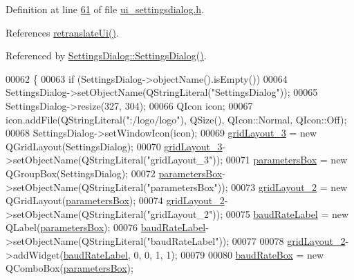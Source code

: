 Definition at line \hyperlink{a00141_source_l00061}{61} of file \hyperlink{a00141_source}{ui\+\_\+settingsdialog.\+h}.



References \hyperlink{a00141_source_l00198}{retranslate\+Ui()}.



Referenced by \hyperlink{a00131_source_l00052}{Settings\+Dialog\+::\+Settings\+Dialog()}.


\begin{DoxyCode}
00062     \{
00063         \textcolor{keywordflow}{if} (SettingsDialog->objectName().isEmpty())
00064             SettingsDialog->setObjectName(QStringLiteral(\textcolor{stringliteral}{"SettingsDialog"}));
00065         SettingsDialog->resize(327, 304);
00066         QIcon icon;
00067         icon.addFile(QStringLiteral(\textcolor{stringliteral}{":/logo/logo"}), QSize(), QIcon::Normal, QIcon::Off);
00068         SettingsDialog->setWindowIcon(icon);
00069         \hyperlink{a00082_a2cc53955b73f22f0cfcf508da4654b16}{gridLayout\_3} = \textcolor{keyword}{new} QGridLayout(SettingsDialog);
00070         \hyperlink{a00082_a2cc53955b73f22f0cfcf508da4654b16}{gridLayout\_3}->setObjectName(QStringLiteral(\textcolor{stringliteral}{"gridLayout\_3"}));
00071         \hyperlink{a00082_a47cebbe70a990bd1f309250101022889}{parametersBox} = \textcolor{keyword}{new} QGroupBox(SettingsDialog);
00072         \hyperlink{a00082_a47cebbe70a990bd1f309250101022889}{parametersBox}->setObjectName(QStringLiteral(\textcolor{stringliteral}{"parametersBox"}));
00073         \hyperlink{a00082_a7b71d6038a34f600625f007630c5234e}{gridLayout\_2} = \textcolor{keyword}{new} QGridLayout(\hyperlink{a00082_a47cebbe70a990bd1f309250101022889}{parametersBox});
00074         \hyperlink{a00082_a7b71d6038a34f600625f007630c5234e}{gridLayout\_2}->setObjectName(QStringLiteral(\textcolor{stringliteral}{"gridLayout\_2"}));
00075         \hyperlink{a00082_a57e59712bae4f482b1ff1d61c81471e8}{baudRateLabel} = \textcolor{keyword}{new} QLabel(\hyperlink{a00082_a47cebbe70a990bd1f309250101022889}{parametersBox});
00076         \hyperlink{a00082_a57e59712bae4f482b1ff1d61c81471e8}{baudRateLabel}->setObjectName(QStringLiteral(\textcolor{stringliteral}{"baudRateLabel"}));
00077 
00078         \hyperlink{a00082_a7b71d6038a34f600625f007630c5234e}{gridLayout\_2}->addWidget(\hyperlink{a00082_a57e59712bae4f482b1ff1d61c81471e8}{baudRateLabel}, 0, 0, 1, 1);
00079 
00080         \hyperlink{a00082_a766a61db4a8c72219543f7c096ae5601}{baudRateBox} = \textcolor{keyword}{new} QComboBox(\hyperlink{a00082_a47cebbe70a990bd1f309250101022889}{parametersBox});

\end{DoxyCode}
